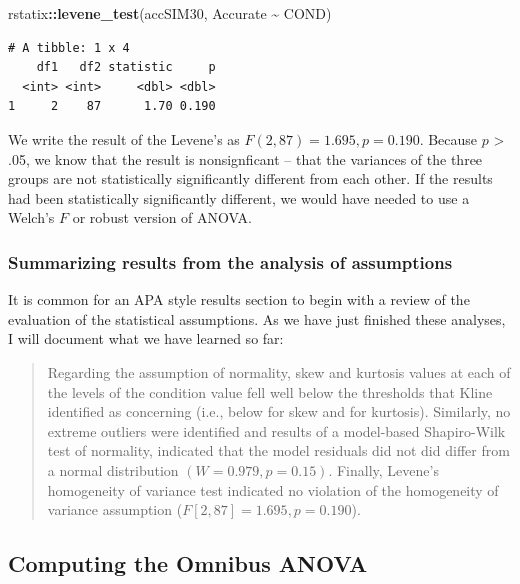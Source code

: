 \documentclass[
  11pt,
]{book}
\newenvironment{Shaded}{\begin{snugshade}}{\end{snugshade}}
\newcommand{\FunctionTok}[1]{\textcolor[rgb]{0.27,0.27,0.27}{\textbf{#1}}}
\newcommand{\NormalTok}[1]{#1}
\newcommand{\SpecialCharTok}[1]{\textcolor[rgb]{0.43,0.43,0.43}{\textbf{#1}}}
\begin{document}
\begin{Shaded}
\begin{Highlighting}[]
\NormalTok{rstatix}\SpecialCharTok{::}\FunctionTok{levene\_test}\NormalTok{(accSIM30, Accurate }\SpecialCharTok{\textasciitilde{}}\NormalTok{ COND)}
\end{Highlighting}
\end{Shaded}

\begin{verbatim}
# A tibble: 1 x 4
    df1   df2 statistic     p
  <int> <int>     <dbl> <dbl>
1     2    87      1.70 0.190
\end{verbatim}

We write the result of the Levene's as \(F(2, 87) = 1.695, p = 0.190\). Because \(p\) \textgreater{} .05, we know that the result is nonsignficant -- that the variances of the three groups are not statistically significantly different from each other. If the results had been statistically significantly different, we would have needed to use a Welch's \(F\) or robust version of ANOVA.

\hypertarget{summarizing-results-from-the-analysis-of-assumptions}{%
\subsubsection{Summarizing results from the analysis of assumptions}\label{summarizing-results-from-the-analysis-of-assumptions}}

It is common for an APA style results section to begin with a review of the evaluation of the statistical assumptions. As we have just finished these analyses, I will document what we have learned so far:

\begin{quote}
Regarding the assumption of normality, skew and kurtosis values at each of the levels of the condition value fell well below the thresholds that Kline \citeyearpar{kline_data_2016} identified as concerning (i.e., below \textbar{} for skew and \textbar{} for kurtosis). Similarly, no extreme outliers were identified and results of a model-based Shapiro-Wilk test of normality, indicated that the model residuals did not did differ from a normal distribution \((W = 0.979, p = 0.15)\). Finally, Levene's homogeneity of variance test indicated no violation of the homogeneity of variance assumption (\(F[2, 87] = 1.695, p = 0.190\)).
\end{quote}

\hypertarget{computing-the-omnibus-anova}{%
\subsection{Computing the Omnibus ANOVA}\label{computing-the-omnibus-anova}}
\end{document}
